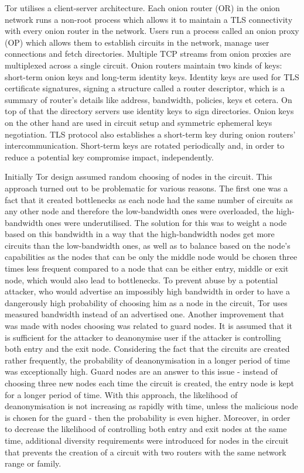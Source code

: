 Tor utilises a client-server architecture. Each onion router (OR) in the onion network runs a non-root process which allows it to maintain a TLS connectivity with every onion router in the network. Users run a process called an onion proxy (OP) which allows them to establish circuits in the network, manage user connections and fetch directories. Multiple TCP streams from onion proxies are multiplexed across a single circuit. Onion routers maintain two kinds of keys: short-term onion keys and long-term identity keys. Identity keys are used for TLS certificate signatures, signing a structure called a router descriptor, which is a summary of router’s details like address, bandwidth, policies, keys et cetera. On top of that the directory servers use identity keys to sign directories. Onion keys on the other hand are used in circuit setup and symmetric ephemeral keys negotiation. TLS protocol also establishes a short-term key during onion routers’ intercommunication. Short-term keys are rotated periodically and, in order to reduce a potential key compromise impact, independently. 

Initially Tor design assumed random choosing of nodes in the circuit. This approach turned out to be problematic for various reasons. The first one was a fact that it created bottlenecks as each node had the same number of circuits as any other node and therefore the low-bandwidth ones were overloaded, the high-bandwidth ones were underutilised. The solution for this was to weight a node based on this bandwidth in a way that the high-bandwidth nodes get more circuits than the low-bandwidth ones, as well as to balance based on the node’s capabilities as the nodes that can be only the middle node would be chosen three times less frequent compared to a node that can be either entry, middle or exit node, which would also lead to bottlenecks. To prevent abuse by a potential attacker, who would advertise an impossibly high bandwidth in order to have a dangerously high probability of choosing him as a node in the circuit, Tor uses measured bandwidth instead of an advertised one. Another improvement that was made with nodes choosing was related to guard nodes. It is assumed that it is sufficient for the attacker to deanonymise user if the attacker is controlling both entry and the exit node. Considering the fact that the circuits are created rather frequently, the probability of deanonymisation in a longer period of time was exceptionally high. Guard nodes are an answer to this issue - instead of choosing three new nodes each time the circuit is created, the entry node is kept for a longer period of time. With this approach, the likelihood of deanonymisation is not increasing as rapidly with time, unless the malicious node is chosen for the guard - then the probability is even higher. Moreover, in order to decrease the likelihood of controlling both entry and exit nodes at the same time, additional diversity requirements were introduced for nodes in the circuit that prevents the creation of a circuit with two routers with the same network range or family.

